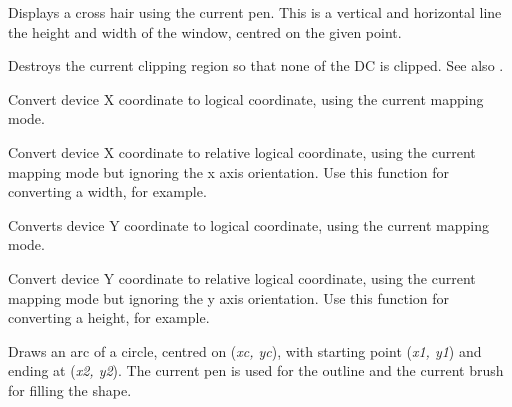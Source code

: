 \label{wxdccrosshair}


Displays a cross hair using the current pen. This is a vertical
and horizontal line the height and width of the window, centred
on the given point.

\label{wxdcdestroyclippingregion}


Destroys the current clipping region so that none of the DC is clipped.
See also .

\label{wxdcdevicetologicalx}


Convert device X coordinate to logical coordinate, using the current
mapping mode.

\label{wxdcdevicetologicalxrel}


Convert device X coordinate to relative logical coordinate, using the current
mapping mode but ignoring the x axis orientation.
Use this function for converting a width, for example.

\label{wxdcdevicetologicaly}


Converts device Y coordinate to logical coordinate, using the current
mapping mode.

\label{wxdcdevicetologicalyrel}


Convert device Y coordinate to relative logical coordinate, using the current
mapping mode but ignoring the y axis orientation.
Use this function for converting a height, for example.

\label{wxdcdrawarc}


Draws an arc of a circle, centred on ({\it xc, yc}), with starting point ({\it x1, y1})
and ending at ({\it x2, y2}).   The current pen is used for the outline
and the current brush for filling the shape.

